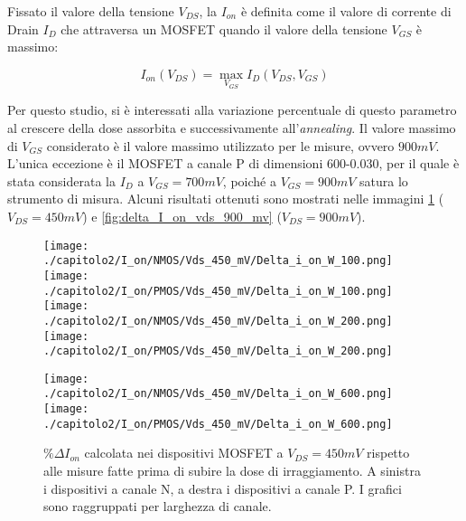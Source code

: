 Fissato il valore della tensione $V_{DS}$, la $I_{on}$ è definita come il valore di corrente di Drain $I_D$ che attraversa un MOSFET quando il valore della tensione $V_{GS}$ è massimo:

\begin{equation}
    I_{on}(V_{DS}) = \max_{V_{GS}} I_D(V_{DS},V_{GS})
\end{equation}

Per questo studio, si è interessati alla variazione percentuale di questo parametro al crescere della dose assorbita e successivamente all'\emph{annealing}. Il valore massimo di $V_{GS}$ considerato è il valore massimo utilizzato per le misure, ovvero $900 mV$. L'unica eccezione è il MOSFET a canale P di dimensioni 600-0.030, per il quale è stata considerata la $I_D$ a $V_{GS} = 700 mV$, poiché a $V_{GS} = 900mV$ satura lo strumento di misura. Alcuni risultati ottenuti sono mostrati nelle immagini \ref{fig:delta_I_on_vds_450_mv} ($V_{DS} = 450 mV$) e \ref{fig:delta_I_on_vds_900_mv} ($V_{DS} = 900 mV$).

\begin{figure}[h]
    \centering
    \texttt{[image: ./capitolo2/I\_on/NMOS/Vds\_450\_mV/Delta\_i\_on\_W\_100.png]}
    \texttt{[image: ./capitolo2/I\_on/PMOS/Vds\_450\_mV/Delta\_i\_on\_W\_100.png]}\\
    \vspace{0.2cm}
    \texttt{[image: ./capitolo2/I\_on/NMOS/Vds\_450\_mV/Delta\_i\_on\_W\_200.png]}
    \texttt{[image: ./capitolo2/I\_on/PMOS/Vds\_450\_mV/Delta\_i\_on\_W\_200.png]}\\
    \vspace{0.2cm}

    \texttt{[image: ./capitolo2/I\_on/NMOS/Vds\_450\_mV/Delta\_i\_on\_W\_600.png]}
    \texttt{[image: ./capitolo2/I\_on/PMOS/Vds\_450\_mV/Delta\_i\_on\_W\_600.png]}

    \caption[Dati $\% \Delta I_{on}$ a $V_{DS}=440mV$ ]{$\% \Delta I_{on}$ calcolata nei dispositivi MOSFET a $V_{DS} = 450mV$ rispetto alle misure fatte prima di subire la dose di irraggiamento. A sinistra i dispositivi a canale N, a destra i dispositivi a canale P. I grafici sono raggruppati per larghezza di canale.}
    \label{fig:delta_I_on_vds_450_mv}

\end{figure}

